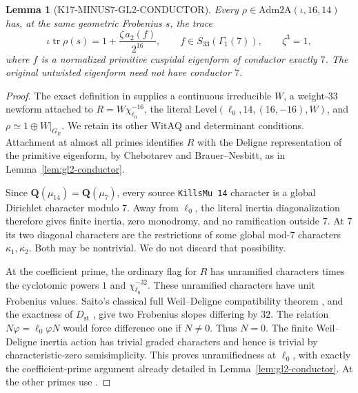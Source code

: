 \documentclass[11pt,a4paper]{article}
\newtheorem{lemma}[theorem]{Lemma}
\theoremstyle{definition}
\begin{document}
\begin{lemma}[K17-MINUS7-GL2-CONDUCTOR]\label{lem:minus7-gl2-conductor}
Every \(\rho\in\mathrm{Adm2A}(\iota,16,14)\) has, at the same
geometric Frobenius \(s\), the trace
\[
 \iota\operatorname{tr}\rho(s)
   =1+\frac{\zeta\,a_2(f)}{2^{16}},
 \qquad f\in S_{33}(\Gamma_1(7)),\qquad \zeta^3=1,
 \tag{S7.3}
\]
where \(f\) is a normalized primitive cuspidal eigenform of
conductor exactly \(7\). The original untwisted eigenform need
not have conductor \(7\).
\end{lemma}

\begin{proof}
The exact definition in  supplies a
continuous irreducible \(W\), a weight-\(33\) newform attached to
\(R=W\chi_{\ell_0}^{-16}\), the literal
\(\mathrm{Level}(\ell_0,14,(16,-16),W)\), and
\(\rho\simeq1\oplus W|_{G_E}\). We retain its other
\(\mathrm{WitAQ}\) and determinant conditions.
Attachment at almost all primes identifies \(R\) with the
Deligne representation of the primitive eigenform, by
Chebotarev and Brauer--Nesbitt, as in
Lemma~\ref{lem:gl2-conductor}.

Since \(\mathbf Q(\mu_{14})=\mathbf Q(\mu_7)\), every source
\texttt{KillsMu 14} character is a global Dirichlet character
modulo \(7\). Away from \(\ell_0\), the literal inertia
diagonalization therefore gives finite inertia, zero monodromy,
and no ramification outside \(7\). At \(7\) its two diagonal
characters are the restrictions of some global mod-\(7\)
characters \(\kappa_1,\kappa_2\). Both may be nontrivial.
We do not discard that possibility.

At the coefficient prime, the ordinary flag for \(R\) has
unramified characters times the cyclotomic powers \(1\) and
\(\chi_{\ell_0}^{-32}\). These unramified characters have unit
Frobenius values. Saito's classical full Weil--Deligne
compatibility theorem
\cite[\S2c, Theorem~3, p.~9]{K17SaitoSurvey}, and the exactness
of \(D_{\mathrm{st}}\)
\cite[\S4.1, Proposition~4.2, p.~23]{K17ColmezFontaine2000},
give two Frobenius slopes differing by \(32\).
The relation \(N\varphi=\ell_0\varphi N\) would force difference
one if \(N\ne0\). Thus \(N=0\). The finite Weil--Deligne
inertia action has trivial graded characters and hence is
trivial by characteristic-zero semisimplicity. This proves
unramifiedness at \(\ell_0\), with exactly the coefficient-prime
argument already detailed in Lemma~\ref{lem:gl2-conductor}.
At the other primes use
\cite[\S0.7, Theorem~A, pp.~410--411]{K17Carayol1986}.


\end{proof}
\end{document}
